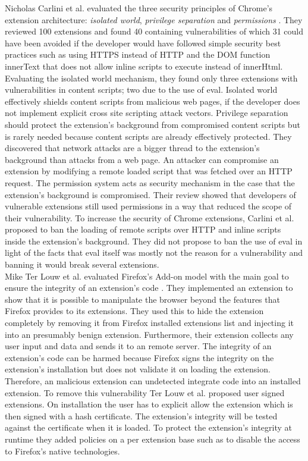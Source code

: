 		Nicholas Carlini et al. evaluated the three security principles of Chrome's extension architecture: \textit{isolated world}, \textit{privilege separation} and \textit{permissions} \cite{Carlini:2012:EGC:2362793.2362800}. They reviewed 100 extensions and found 40 containing vulnerabilities of which 31 could have been avoided if the developer would have followed simple security best practices such as using HTTPS instead of HTTP and the DOM function innerText that does not allow inline scripts to execute instead of innerHtml. Evaluating the isolated world mechanism, they found only three extensions with vulnerabilities in content scripts; two due to the use of eval. Isolated world effectively shields content scripts from malicious web pages, if the developer does not implement explicit cross site scripting attack vectors. Privilege separation should protect the extension's background from compromised content scripts but is rarely needed because content scripts are already effectively protected. They discovered that network attacks are a bigger thread to the extension's background than attacks from a web page. An attacker can compromise an extension by modifying a remote loaded script that was fetched over an HTTP request. The permission system acts as security mechanism in the case that the extension's background is compromised. Their review showed that developers of vulnerable extensions still used permissions in a way that reduced the scope of their vulnerability. To increase the security of Chrome extensions, Carlini et al. proposed to ban the loading of remote scripts over HTTP and inline scripts inside the extension's background. They did not propose to ban the use of eval in light of the facts that eval itself was mostly not the reason for a vulnerability and banning it would break several extensions. \\
	
		Mike Ter Louw et al. evaluated Firefox's Add-on model with the main goal to ensure the integrity of an extension's code \cite{TerLouw:2007:EWB:1420581.1420583}. They implemented an extension to show that it is possible to manipulate the browser beyond the features that Firefox provides to its extensions. They used this to hide the extension completely by removing it from Firefox installed extensions list and injecting it into an presumably benign extension. Furthermore, their extension collects any user input and data and sends it to an remote server. The integrity of an extension's code can be harmed because Firefox signs the integrity on the extension's installation but does not validate it on loading the extension. Therefore, an malicious extension can undetected integrate code into an installed extension. To remove this vulnerability Ter Louw et al. proposed user signed extensions. On installation the user has to explicit allow the extension which is then signed with a hash certificate. The extension's integrity will be tested against the certificate when it is loaded. To protect the extension's integrity at runtime they added policies on a per extension base such as to disable the access to Firefox's native technologies. \\ 
		
